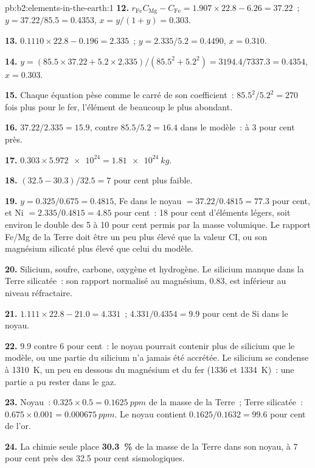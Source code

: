 \begin{solution}{pb:b2:elements-in-the-earth:1}
\textbf{12.} $r_{\mathrm{Fe}}C_{\mathrm{Mg}} - C_{\mathrm{Fe}} = 1.907\times22.8 - 6.26 =
37.22$~; $y = 37.22/85.5 = 0.4353$, $x = y/(1+y) = 0.303$.

\textbf{13.} $0.1110\times22.8 - 0.196 = 2.335$~; $y = 2.335/5.2 = 0.4490$, $x = 0.310$.

\textbf{14.} $y = (85.5\times37.22 + 5.2\times2.335)/(85.5^2 + 5.2^2) =
3194.4/7337.3 = 0.4354$, $x = 0.303$.

\textbf{15.} Chaque équation pèse comme le carré de son coefficient~:
$85.5^2/5.2^2 = 270$ fois plus pour le fer, l'élément de beaucoup le plus abondant.

\textbf{16.} $37.22/2.335 = 15.9$, contre
$85.5/5.2 = 16.4$ dans le modèle~: à 3 pour cent près.

\textbf{17.} $0.303\times\num{5.972e24} = \qty{1.81e24}{kg}$.

\textbf{18.} $(32.5-30.3)/32.5 = 7$ pour cent plus faible.

\textbf{19.} $y = 0.325/0.675 = 0.4815$, Fe dans le noyau $= 37.22/0.4815 = 77.3$ pour cent,
et Ni $= 2.335/0.4815 = 4.85$ pour cent~: 18 pour cent d'éléments légers, soit environ le double
des 5 à 10 pour cent permis par la masse volumique. Le rapport Fe/Mg de la Terre doit être
un peu plus élevé que la valeur CI, ou son magnésium silicaté plus élevé que celui du modèle.

\textbf{20.} Silicium, soufre, carbone, oxygène et hydrogène. Le silicium manque dans la Terre
silicatée~: son rapport normalisé au magnésium, 0.83, est inférieur au niveau réfractaire.

\textbf{21.} $1.111\times22.8 - 21.0 = 4.331$~;
$4.331/0.4354 = 9.9$ pour cent de Si dans le noyau.

\textbf{22.} 9.9 contre 6 pour cent~: le noyau pourrait contenir plus de silicium que le modèle,
ou une partie du silicium n'a jamais été accrétée. Le silicium se condense à \qty{1310}{K}, un peu
en dessous du magnésium et du fer (1336 et \qty{1334}{K})~: une partie a pu rester dans le gaz.

\textbf{23.} Noyau~: $0.325\times0.5 = \qty{0.1625}{ppm}$ de la masse
de la Terre~; Terre silicatée~: $0.675\times0.001 = \qty{0.000675}{ppm}$.
Le noyau contient $0.1625/0.1632 = 99.6$ pour cent de l'or.

\textbf{24.} La chimie seule place
\textbf{\qty[text-series-to-math=true]{30.3}{\percent}} de la masse de la Terre dans son noyau,
à 7 pour cent près des 32.5 pour cent sismologiques.
\end{solution}
